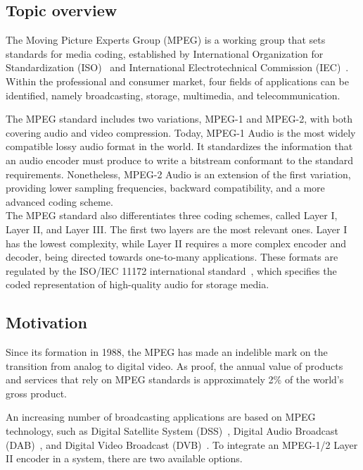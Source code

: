 \subsection{Topic overview}

The Moving Picture Experts Group (MPEG) is a working group that sets standards for media coding, established by International Organization for Standardization (ISO)~\cite{iso} and International Electrotechnical Commission (IEC)~\cite{iec}. Within the professional and consumer market, four fields of applications can be identified, namely broadcasting, storage, multimedia, and telecommunication.

The MPEG standard includes two variations, MPEG-1 and MPEG-2, with both covering audio and video compression.  Today, MPEG-1 Audio is the most widely compatible lossy audio format in the world. It standardizes the information that an audio encoder must produce to write a bitstream conformant to the standard requirements.  Nonetheless, MPEG-2 Audio is an extension of the first variation, providing lower sampling frequencies, backward compatibility, and a more advanced coding scheme.\\

The MPEG standard also differentiates three coding schemes, called Layer I, Layer II, and Layer III.  The first two layers are the most relevant ones. Layer I has the lowest complexity, while Layer II requires a more complex encoder and decoder, being directed towards one-to-many applications. These formats are regulated by the ISO/IEC 11172 international standard~\cite{11172}, which specifies the coded representation of high-quality audio for storage media.

\subsection{Motivation}

Since its formation in 1988, the MPEG has made an indelible mark on the transition from analog to digital video. As proof, the annual value of products and services that rely on MPEG standards is approximately 2\% of the world's gross product.

An increasing number of broadcasting applications are based on MPEG technology, such as Digital Satellite System (DSS)~\cite{dss}, Digital Audio Broadcast (DAB)~\cite{dab}, and Digital Video Broadcast (DVB)~\cite{dvb}. To integrate an MPEG-1/2 Layer II encoder in a system, there are two available options.

